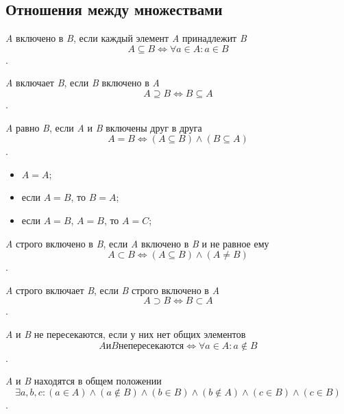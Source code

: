 \documentclass{beamer}
\begin{document}
\subsection{Отношения между множествами}
\begin{frame}
\begin{block}{\textit{A} включено в \textit{B}, если каждый элемент \textit{A} принадлежит \textit{B}}
\[A \subseteq B \Leftrightarrow \forall a\in A: a\in B\].
\end{block}
\begin{block}{\textit{A} включает \textit{B}, если \textit{B} включено в \textit{A}}
\[A \supseteq B \Leftrightarrow B \subseteq A \].
\end{block}
\begin{block}{\textit{A} равно \textit{B}, если \textit{A} и \textit{B} включены друг в друга}
\[A=B \Leftrightarrow (A\subseteq B)\wedge(B\subseteq A) \].
\end{block}
\begin{itemize}
\item $A = A$;
\item если $A = B$, то $B = A$;
\item если $A = B$, $A = B$, то $A = C$;
\end{itemize}
\end{frame}

\begin{frame}
\begin{block}{\textit{A} строго включено в \textit{B}, если \textit{A} включено в \textit{B} и не равное ему}
\[A \subset B \Leftrightarrow (A \subseteq B)\wedge (A \neq B)\].
\end{block}
\begin{block}{\textit{A} строго включает \textit{B}, если \textit{B} строго включено в \textit{A}}
\[A \supset B \Leftrightarrow B \subset A \].
\end{block}
\begin{block}{\textit{A} и \textit{B} не пересекаются, если у них нет общих элементов}
\[A и B не пересекаются \Leftrightarrow \forall a \in A: a \notin B \].
\end{block}
\begin{block}{\textit{A} и \textit{B} находятся в общем положении}
\[ \exists a,b,c: (a\in A)\wedge(a \notin B)\wedge(b\in B)\wedge(b \notin A)\wedge(c\in B)\wedge(c \in B)\].
\end{block}
\end{frame}
\end{document}
